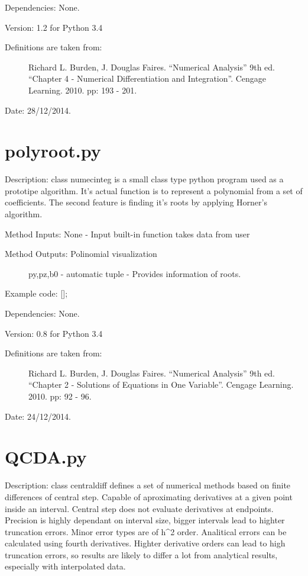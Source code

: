 \documentclass[letterpaper,10pt,oneside]{sphinxmanual}
\theoremstyle{plain}%
\theoremstyle{definition}%
\theoremstyle{remark}%
\begin{document}
Dependencies: None.

Version: 1.2 for Python 3.4
\begin{description}
\item[{Definitions are taken from:}] \leavevmode
Richard L. Burden, J. Douglas Faires. ``Numerical Analysis'' 9th ed.
``Chapter 4 - Numerical Differentiation and Integration''. 
Cengage Learning. 2010. pp: 193 - 201.

\end{description}




Date: 28/12/2014.


\section{polyroot.py}
\label{code:polyroot-py}\label{code:module-polyroot}
Description: class numecinteg is a small class type python program used as 
a prototipe algorithm. It's actual function is to represent a polynomial from
a set of coefficients. The second feature is finding it's roots by applying
Horner's algorithm.

Method Inputs: None - Input built-in function takes data from user
\begin{description}
\item[{Method Outputs: Polinomial visualization}] \leavevmode
py,pz,b0 - automatic tuple - Provides information of roots.

\end{description}

Example code: {[}{]};

Dependencies: None.

Version: 0.8 for Python 3.4
\begin{description}
\item[{Definitions are taken from:}] \leavevmode
Richard L. Burden, J. Douglas Faires. ``Numerical Analysis'' 9th ed.
``Chapter 2 - Solutions of Equations in One Variable''. 
Cengage Learning. 2010. pp: 92 - 96.

\end{description}




Date: 24/12/2014.


\section{QCDA.py}
\label{code:module-QCDA}\label{code:qcda-py}
Description: class centraldiff defines a set of numerical methods based on
finite differences of central step. Capable of aproximating derivatives at
a given point inside an interval. Central step does not evaluate derivatives
at endpoints. Precision is highly dependant on interval size, bigger intervals
lead to highter truncation errors. Minor error types are of h\textasciicircum{}2 order.
Analitical errors can be calculated using fourth derivatives. Highter
derivative orders can lead to high truncation errors, so results are likely
to differ a lot from analytical results, especially with interpolated data.
\end{document}
